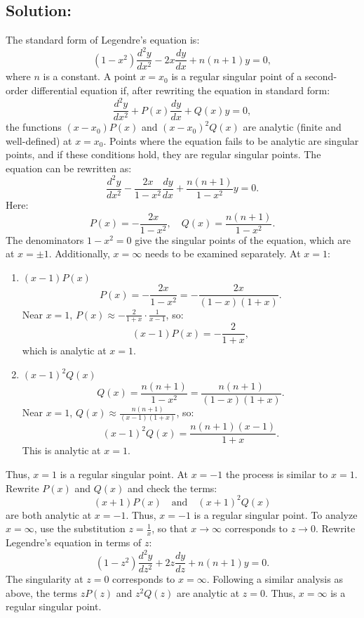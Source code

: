 \documentclass[12pt]{article}
\begin{document}
    \subsection*{Solution:}
        The standard form of Legendre’s equation is:
        \[
        (1 - x^2) \frac{d^2y}{dx^2} - 2x \frac{dy}{dx} + n(n+1)y = 0,
        \]
        where \(n\) is a constant.
        A point \(x = x_0\) is a regular singular point of a second-order differential equation if, after rewriting the equation in standard form:
        \[
        \frac{d^2y}{dx^2} + P(x)\frac{dy}{dx} + Q(x)y = 0,
        \]
        the functions \((x - x_0)P(x)\) and \((x - x_0)^2Q(x)\) are analytic (finite and well-defined) at \(x = x_0\). Points where the equation fails to be analytic are singular points, and if these conditions hold, they are regular singular points.
        The equation can be rewritten as:
        \[
        \frac{d^2y}{dx^2} - \frac{2x}{1 - x^2} \frac{dy}{dx} + \frac{n(n+1)}{1 - x^2} y = 0.
        \]
        Here:
        \[
        P(x) = -\frac{2x}{1 - x^2}, \quad Q(x) = \frac{n(n+1)}{1 - x^2}.
        \]
        The denominators \(1 - x^2 = 0\) give the singular points of the equation, which are at \(x = \pm 1\). Additionally, \(x = \infty\) needs to be examined separately. At \(x = 1\):
        \begin{enumerate}
            \item \((x - 1)P(x)\)
            \[
            P(x) = -\frac{2x}{1 - x^2} = -\frac{2x}{(1 - x)(1 + x)}.
            \]
            Near \(x = 1\), \(P(x) \approx -\frac{2}{1 + x} \cdot \frac{1}{x - 1}\), so:
            \[
            (x - 1)P(x) = -\frac{2}{1 + x},
            \]
            which is analytic at \(x = 1\).
            \item \((x - 1)^2Q(x)\)
            \[
            Q(x) = \frac{n(n+1)}{1 - x^2} = \frac{n(n+1)}{(1 - x)(1 + x)}.
            \]
            Near \(x = 1\), \(Q(x) \approx \frac{n(n+1)}{(x - 1)(1 + x)}\), so:
            \[
            (x - 1)^2Q(x) = \frac{n(n+1)(x - 1)}{1 + x}.
            \]
            This is analytic at \(x = 1\).
        \end{enumerate}
        Thus, \(x = 1\) is a regular singular point. At \(x = -1\) the process is similar to \(x = 1\). Rewrite \(P(x)\) and \(Q(x)\) and check the terms:
        \[
        (x + 1)P(x) \quad \text{and} \quad (x + 1)^2Q(x)
        \]
        are both analytic at \(x = -1\).
        Thus, \(x = -1\) is a regular singular point.
        To analyze \(x = \infty\), use the substitution \(z = \frac{1}{x}\), so that \(x \to \infty\) corresponds to \(z \to 0\). Rewrite Legendre’s equation in terms of \(z\):
        \[
        (1 - z^2) \frac{d^2y}{dz^2} + 2z \frac{dy}{dz} + n(n+1)y = 0.
        \]
        The singularity at \(z = 0\) corresponds to \(x = \infty\). Following a similar analysis as above, the terms \(zP(z)\) and \(z^2Q(z)\) are analytic at \(z = 0\).
        Thus, \(x = \infty\) is a regular singular point.
\end{document}
